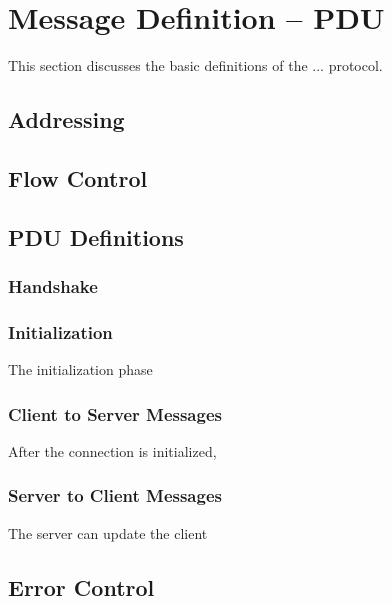 \section{Message Definition -- PDU}
\label{sec:pdus}

This section discusses the basic definitions of the ... protocol. 

\subsection{Addressing}
\label{sec:pdus:addr}

\subsection{Flow Control}
\label{sec:pdus:flow}


\subsection{PDU Definitions}
\label{sec:pdus:pdu}


\subsubsection{Handshake}
\label{sec:pdus:pdu:hs}


\subsubsection{Initialization}
\label{sec:pdus:pdu:init}

The initialization phase


\subsubsection{Client to Server Messages}
\label{sec:pdus:pdu:c_to_s}

After the connection is initialized,

\subsubsection{Server to Client Messages}
\label{sec:pdus:pdu:s_to_c}

The server can update the client 
\subsection{Error Control}
\label{sec:pdus:err}


